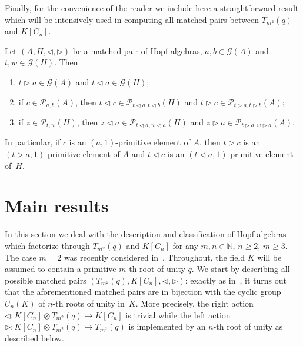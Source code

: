 Finally, for the convenience of the reader we include here a straightforward result which will be intensively used in computing all matched pairs between $T_{m^{2}}(q)$ and $K[C_{n}]$.
\begin{Lemma}\label{primitive}
Let $(A, H, \triangleleft, \triangleright)$ be a matched pair of Hopf algebras, $a, b \in \mathcal{G}(A)$ and $t, w\in \mathcal{G}(H)$. Then
\begin{enumerate}\itemsep=0pt
\item[$(1)$] $t \triangleright a \in \mathcal{G}(A)$ and $t\triangleleft a \in \mathcal{G}(H)$;

\item[$(2)$] if $c \in \mathcal{P}_{a, b}(A)$, then $t \triangleleft c \in \mathcal{P}_{t\triangleleft a, t\triangleleft b} (H)$ and
$t \triangleright c \in \mathcal{P}_{t\triangleright a, t\triangleright b} (A)$;

\item[$(3)$] if $z \in \mathcal{P}_{t, w}(H)$, then $z \triangleleft a \in \mathcal{P}_{t\triangleleft a, w\triangleleft a} (H)$ and $z \triangleright a \in \mathcal{P}_{t\triangleright a, w\triangleright a} (A)$.
\end{enumerate}
In particular, if $c$ is an $(a, 1)$-primitive element of $A$, then $t \triangleright c$ is an $(t\triangleright a, 1)$-primitive element of $A$ and $t \triangleleft c$ is an $(t\triangleleft a, 1)$-primitive element of~$H$.
\end{Lemma}

\section{Main results}\label{2}

In this section we deal with the description and classification of Hopf algebras which factorize through $T_{m^{2}}(q)$ and $K[C_{n}]$ for any $m, n \in \mathbb{N}$, $n \geqslant 2$, $m \geqslant 3$. The case $m = 2$ was recently considered in~\cite{abm}. Throughout, the field $K$ will be assumed to contain a primitive $m$-th root of unity $q$. We start by describing all possible matched pairs $(T_{m^{2}}(q), K[C_n], \triangleleft,
\triangleright)$: exactly as in~\cite{abm}, it turns out that the aforementioned matched pairs are in bijection with the cyclic group~$U_n (K)$ of
$n$-th roots of unity in~$K$. More precisely, the right action $\triangleleft \colon K[C_{n}] \otimes T_{m^{2}}(q) \to K[C_{n}]$ is trivial while
the left action $\triangleright \colon K[C_{n}] \otimes T_{m^{2}}(q) \to T_{m^{2}}(q)$ is implemented by an $n$-th root of unity as described below.

